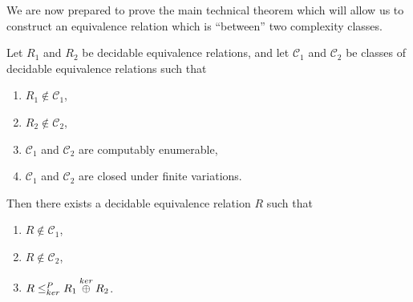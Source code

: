 We are now prepared to prove the main technical theorem which will allow us to construct an equivalence relation which is ``between'' two complexity classes.

\begin{theorem}\label{thm:diag}
  Let $R_1$ and $R_2$ be decidable equivalence relations, and let $\mathcal{C}_1$ and $\mathcal{C}_2$ be classes of decidable equivalence relations such that
  \begin{enumerate}
  \item $R_1\notin\mathcal{C}_1$,
  \item $R_2\notin\mathcal{C}_2$,
  \item $\mathcal{C}_1$ and $\mathcal{C}_2$ are computably enumerable,
  \item $\mathcal{C}_1$ and $\mathcal{C}_2$ are closed under finite variations.
  \end{enumerate}
  Then there exists a decidable equivalence relation $R$ such that
  \begin{enumerate}
  \item $R\notin \mathcal{C}_1$,
  \item $R\notin \mathcal{C}_2$,
  \item $R\leq^{P}_{ker} R_1\overset{ker}{\oplus} R_2$.
  \end{enumerate}
\end{theorem}
